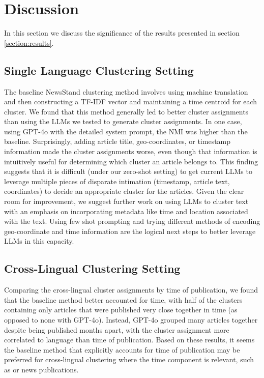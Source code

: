 \section{Discussion}\label{section:discussion}

In this section we discuss the significance of the results presented in section \ref{section:results}.

\subsection{Single Language Clustering Setting}
The baseline NewsStand clustering method involves using machine translation and then constructing a TF-IDF vector and maintaining a time centroid for each cluster.
We found that this method generally led to better cluster assignments than using the LLMs we tested to generate cluster assignments.
In one case, using GPT-4o with the detailed system prompt, the NMI was higher than the baseline.
Surprisingly, adding article title, geo-coordinates, or timestamp information made the cluster assignments worse, even though that information is intuitively useful for determining which cluster an article belongs to.
This finding suggests that it is difficult (under our zero-shot setting) to get current LLMs to leverage multiple pieces of disparate intimation (timestamp, article text, coordinates) to decide an appropriate cluster for the articles.
Given the clear room for improvement, we suggest further work on using LLMs to cluster text with an emphasis on incorporating metadata like time and location associated with the text.
Using few shot prompting and trying different methods of encoding geo-coordinate and time information are the logical next steps to better leverage LLMs in this capacity.

\subsection{Cross-Lingual Clustering Setting}

Comparing the cross-lingual cluster assignments by time of publication, we found that the baseline method better accounted for time, with half of the clusters containing only articles that were published very close together in time (as opposed to none with GPT-4o).
Instead, GPT-4o grouped many articles together despite being published months apart, with the cluster assignment more correlated to language than time of publication.
Based on these results, it seems the baseline method that explicitly accounts for time of publication may be preferred for cross-lingual clustering where the time component is relevant, such as or news publications.

